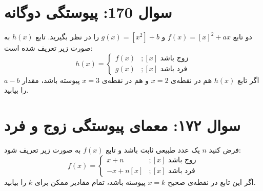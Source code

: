 \documentclass[12pt]{article}
\begin{document}
\vspace{1cm}
\hrulefill
\vspace{1cm}


\section*{سوال 170: پیوستگی دوگانه}
دو تابع \(f(x) = [x]^2 + ax\) و \(g(x) = [x^2] + b\) را در نظر بگیرید. تابع \(h(x)\) به صورت زیر تعریف شده است:
\begin{displaymath}
	h(x) = 
	\begin{cases}
		f(x) & ; [x] \text{ زوج باشد} \\
		g(x) & ;  [x] \text{ فرد باشد}
	\end{cases}
\end{displaymath}
اگر تابع \(h(x)\) هم در نقطه‌ی \(x=2\) و هم در نقطه‌ی \(x=3\) پیوسته باشد، مقدار \(a-b\) را بیابید.

\vspace{1cm}
\hrulefill
\vspace{1cm}
\section*{سوال ۱۷۲: معمای پیوستگی زوج و فرد}
فرض کنید \(n\) یک عدد طبیعی ثابت باشد و تابع \(f(x)\) به صورت زیر تعریف شود:
\begin{displaymath}
	f(x) = 
	\begin{cases}
		x + n & ;  [x] \text{ زوج باشد} \\
		-x + n[x] & ;  [x] \text{ فرد باشد}
	\end{cases}
\end{displaymath}
اگر این تابع در نقطه‌ی صحیح \(x=k\) پیوسته باشد، تمام مقادیر ممکن برای \(k\) را بیابید.

\vspace{1cm}
\hrulefill
\vspace{1cm}

\end{document}
